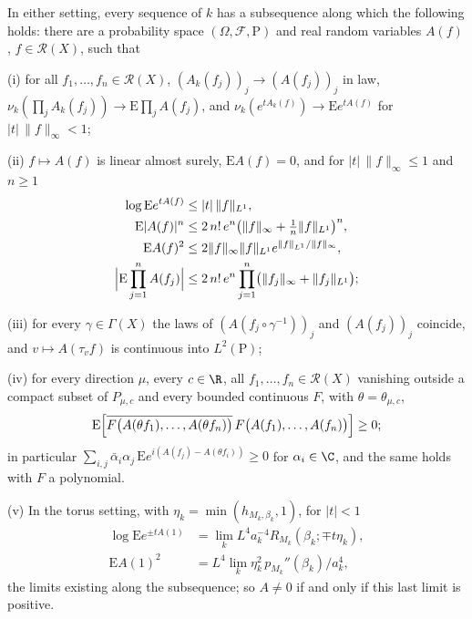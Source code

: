 \begin{theorem}
\label{rU7:limit}
In either setting, every sequence of $k$ has a subsequence along which the
following holds: there are a probability space $(\Omega,\mathcal F,\mathrm P)$
and real random variables $A(f)$, $f\in\mathcal R(X)$, such that

\textup{(i)} for all $f_1,\dots,f_n\in\mathcal R(X)$, $(A_k(f_j))_j\to(A(f_j))
_j$ in law, $\nu_k(\prod_jA_k(f_j))\to\mathrm E\prod_jA(f_j)$, and
$\nu_k(e^{tA_k(f)})\to\mathrm Ee^{tA(f)}$ for $|t|\,\|f\|_\infty<1$;

\textup{(ii)} $f\mapsto A(f)$ is linear almost surely, $\mathrm EA(f)=0$, and
for $|t|\,\|f\|_\infty\le1$ and $n\ge1$
\begin{align*}
\log\mathrm Ee^{tA(f)}&\le|t|\,\|f\|_{L^1},\\
\mathrm E|A(f)|^n&\le2\,n!\,e^n\bigl(\|f\|_\infty+\tfrac1n\|f\|_{L^1}\bigr)^n,\\
\mathrm EA(f)^2&\le2\|f\|_\infty\|f\|_{L^1}e^{\|f\|_{L^1}/\|f\|_\infty},\\
\Bigl|\mathrm E\prod_{j=1}^nA(f_j)\Bigr|&\le2\,n!\,e^n\prod_{j=1}^n\bigl(
\|f_j\|_\infty+\|f_j\|_{L^1}\bigr);
\end{align*}

\textup{(iii)} for every $\gamma\in\Gamma(X)$ the laws of
$(A(f_j\circ\gamma^{-1}))_j$ and $(A(f_j))_j$ coincide, and $v\mapsto
A(\tau_vf)$ is continuous into $L^2(\mathrm P)$;

\textup{(iv)} for every direction $\mu$, every $c\in\R$, all $f_1,\dots,f_n\in
\mathcal R(X)$ vanishing outside a compact subset of $P_{\mu,c}$ and every
bounded continuous $F$, with $\theta=\theta_{\mu,c}$,
\[
\mathrm E\Bigl[\overline{F\bigl(A(\theta f_1),\dots,A(\theta f_n)\bigr)}\,
F\bigl(A(f_1),\dots,A(f_n)\bigr)\Bigr]\ge0 ;
\]
in particular $\sum_{i,j}\bar\alpha_i\alpha_j\,\mathrm Ee^{i(A(f_j)-A(\theta
f_i))}\ge0$ for $\alpha_i\in\C$, and the same holds with $F$ a polynomial.

\textup{(v)} In the torus setting, with $\eta_k=\min(h_{M_k,\beta_k},1)$,
for $|t|<1$
\begin{align*}
\log\mathrm Ee^{\pm tA(1)}&=\lim_kL^4a_k^{-4}R_{M_k}(\beta_k;\mp t\eta_k),\\
\mathrm EA(1)^2&=L^4\lim_k\eta_k^2\,p_{M_k}''(\beta_k)/a_k^4,
\end{align*}
the limits existing along the subsequence; so $A\ne0$ if and only if this
last limit is positive.
\end{theorem}

